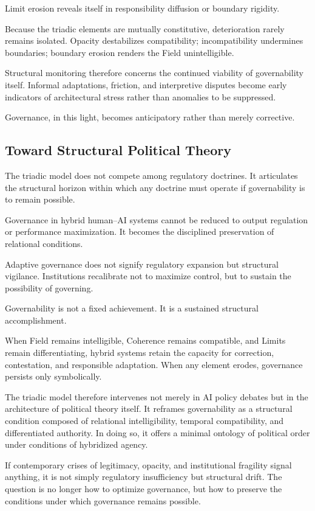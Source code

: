 \documentclass[12pt]{article}
\begin{document}
Limit erosion reveals itself in responsibility diffusion or boundary rigidity.

Because the triadic elements are mutually constitutive, deterioration rarely remains isolated. Opacity destabilizes compatibility; incompatibility undermines boundaries; boundary erosion renders the Field unintelligible.

Structural monitoring therefore concerns the continued viability of governability itself. Informal adaptations, friction, and interpretive disputes become early indicators of architectural stress rather than anomalies to be suppressed.

Governance, in this light, becomes anticipatory rather than merely corrective.

\subsection{Toward Structural Political Theory}


The triadic model does not compete among regulatory doctrines. It articulates the structural horizon within which any doctrine must operate if governability is to remain possible.

Governance in hybrid human–AI systems cannot be reduced to output regulation or performance maximization. It becomes the disciplined preservation of relational conditions.

Adaptive governance does not signify regulatory expansion but structural vigilance. Institutions recalibrate not to maximize control, but to sustain the possibility of governing.

Governability is not a fixed achievement. It is a sustained structural accomplishment.

When Field remains intelligible, Coherence remains compatible, and Limits remain differentiating, hybrid systems retain the capacity for correction, contestation, and responsible adaptation. When any element erodes, governance persists only symbolically.

The triadic model therefore intervenes not merely in AI policy debates but in the architecture of political theory itself. It reframes governability as a structural condition composed of relational intelligibility, temporal compatibility, and differentiated authority. In doing so, it offers a minimal ontology of political order under conditions of hybridized agency.

If contemporary crises of legitimacy, opacity, and institutional fragility signal anything, it is not simply regulatory insufficiency but structural drift. The question is no longer how to optimize governance, but how to preserve the conditions under which governance remains possible.
\end{document}
